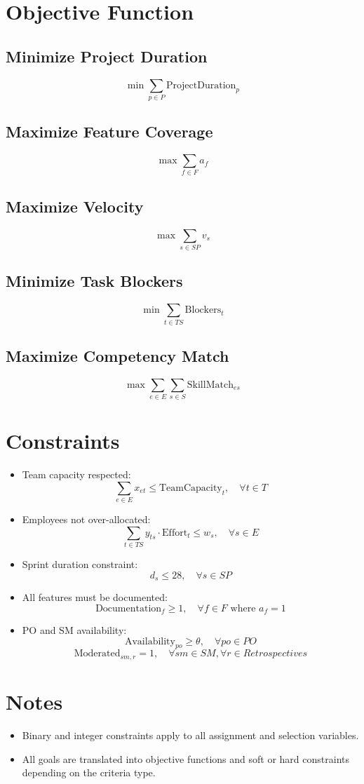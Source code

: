 \documentclass{article}
\begin{document}
\section{Objective Function}
\subsection*{Minimize Project Duration}
\[
\min \sum_{p \in P} \text{ProjectDuration}_p
\]

\subsection*{Maximize Feature Coverage}
\[
\max \sum_{f \in F} a_f
\]

\subsection*{Maximize Velocity}
\[
\max \sum_{s \in SP} v_s
\]

\subsection*{Minimize Task Blockers}
\[
\min \sum_{t \in TS} \text{Blockers}_t
\]

\subsection*{Maximize Competency Match}
\[
\max \sum_{e \in E} \sum_{s \in S} \text{SkillMatch}_{es}
\]

\section{Constraints}
\begin{itemize}
    \item Team capacity respected:
    \[
    \sum_{e \in E} x_{et} \leq \text{TeamCapacity}_t, \quad \forall t \in T
    \]

    \item Employees not over-allocated:
    \[
    \sum_{t \in TS} y_{ts} \cdot \text{Effort}_t \leq w_s, \quad \forall s \in E
    \]

    \item Sprint duration constraint:
    \[
    d_s \leq 28, \quad \forall s \in SP
    \]

    \item All features must be documented:
    \[
    \text{Documentation}_f \geq 1, \quad \forall f \in F \text{ where } a_f = 1
    \]

    \item PO and SM availability:
    \[
    \text{Availability}_{po} \geq \theta, \quad \forall po \in PO
    \]
    \[
    \text{Moderated}_{sm,r} = 1, \quad \forall sm \in SM, \forall r \in Retrospectives
    \]
\end{itemize}

\section{Notes}
\begin{itemize}
    \item Binary and integer constraints apply to all assignment and selection variables.
    \item All goals are translated into objective functions and soft or hard constraints depending on the criteria type.
\end{itemize}
\end{document}
